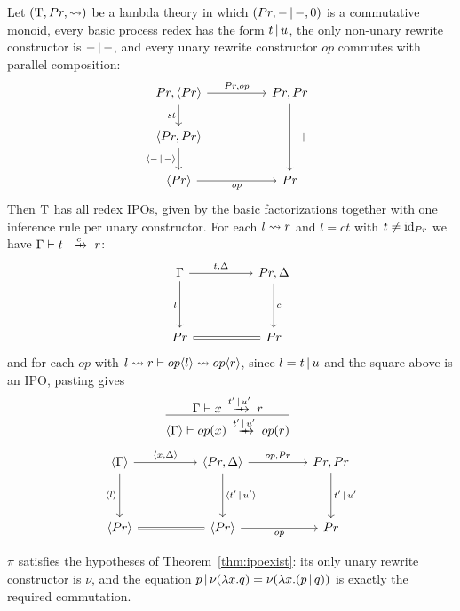 \documentclass{article}
\begin{document}
\begin{theorem}
\label{thm:ipoexist}
    \stSketch{} Let $(\mathrm{T},Pr,\rightsquigarrow)$ be a lambda theory in which $(Pr,-\,|\, -,0)$ is a commutative monoid, every basic process redex has the form $t\,|\, u$, the only non-unary rewrite constructor is $-\,|\,-$, and every unary rewrite constructor $op$ commutes with parallel composition:
    \[\begin{tikzcd}
    	{Pr, \brk{Pr}} && {Pr,Pr} \\
    	{\brk{Pr,Pr}} \\
    	{\brk{Pr}} && Pr
    	\arrow["{Pr,op}", from=1-1, to=1-3]
    	\arrow["st"', from=1-1, to=2-1]
    	\arrow["{-\pr -}", from=1-3, to=3-3]
    	\arrow["{\brk{-\pr -}}"', from=2-1, to=3-1]
    	\arrow["op"', from=3-1, to=3-3]
    \end{tikzcd}\]
    Then $\mathrm{T}$ has all redex IPOs, given by the basic factorizations together with one inference rule per unary constructor. For each $l\rightsquigarrow r$ and $l=ct$ with $t\neq \mathrm{id}_{Pr}$ we have $\Gamma\vdash t\xr{c} r$:
    \[\begin{tikzcd}
    	\Gamma && {Pr,\Delta} \\
    	\\
    	Pr && Pr
    	\arrow["{t,\Delta}", from=1-1, to=1-3]
    	\arrow["l"', from=1-1, to=3-1]
    	\arrow["c", from=1-3, to=3-3]
    	\arrow[equals, from=3-1, to=3-3]
    \end{tikzcd}\]
    and for each $op$ with $l\rightsquigarrow r\vdash op\langle l\rangle\rightsquigarrow op\langle r\rangle$, since $l=t\,|\, u$ and the square above is an IPO, pasting gives
    \[\infr{\Gamma\vdash x\xr{t'\pr u'} r}{\brk{\Gamma} \vdash op(x)\xr{t'\pr u'} op(r)}\]
    \[\begin{tikzcd}
    	{\brk{\Gamma}} && {\brk{Pr,\Delta}} && {Pr,Pr} \\ \\
    	{\brk{Pr}} && {\brk{Pr}} && Pr
        \arrow["\brk{t'\pr u'}", from=1-3, to=3-3]
    	\arrow["{\brk{x,\Delta}}", from=1-1, to=1-3]
    	\arrow["{\brk{l}}"', from=1-1, to=3-1]
    	\arrow["{op,Pr}", from=1-3, to=1-5]
    	\arrow["{t'\pr u'}", from=1-5, to=3-5]
    	\arrow[equals, from=3-1, to=3-3]
    	\arrow["op"', from=3-3, to=3-5]
    \end{tikzcd}\]
\end{theorem}

\begin{corollary}
    $\pi$ satisfies the hypotheses of Theorem~\ref{thm:ipoexist}: its only unary rewrite constructor is $\nu$, and the equation $p\,|\,\nu(\lambda x.q)=\nu(\lambda x.(p\,|\, q))$ is exactly the required commutation.
\end{corollary}
\end{document}

